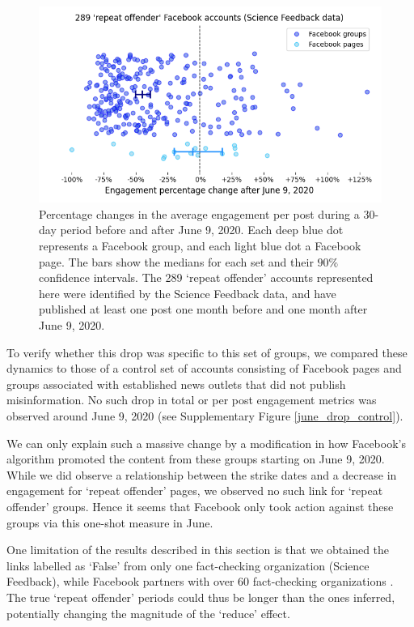 \documentclass[review]{elsarticle}
\begin{document}
\begin{figure}[!h]
\centering
\includegraphics[scale=0.5]{./../figure/sf_june_drop_percentage_change.png}
\caption{
Percentage changes in the average engagement per post during a 30-day period before and after June 9, 2020. 
Each deep blue dot represents a Facebook group, and each light blue dot a Facebook page.
The bars show the medians for each set and their $90\%$ confidence intervals.
The 289 `repeat offender' accounts represented here were identified by the Science Feedback data, and have published at least one post one month before and one month after June 9, 2020.
}
\label{repeat_june_drop_percentage_change}
\end{figure}

To verify whether this drop was specific to this set of groups, we compared these dynamics to those of a control set of accounts consisting of Facebook pages and groups associated with established news outlets that did not publish misinformation.
No such drop in total or per post engagement metrics was observed around June 9, 2020 (see Supplementary Figure \ref{june_drop_control}).

We can only explain such a massive change by a modification in how Facebook’s algorithm promoted the content from these groups starting on June 9, 2020.
While we did observe a relationship between the strike dates and a decrease in engagement for `repeat offender' pages, we observed no such link for `repeat offender' groups.
Hence it seems that Facebook only took action against these groups via this one-shot measure in June.

One limitation of the results described in this section is that we obtained the links labelled as `False' from only one fact-checking organization (Science Feedback), while Facebook partners with over 60 fact-checking organizations \citep{60factCheckingPartners}.
The true `repeat offender' periods could thus be longer than the ones inferred, potentially changing the magnitude of the ‘reduce’ effect.
\end{document}
